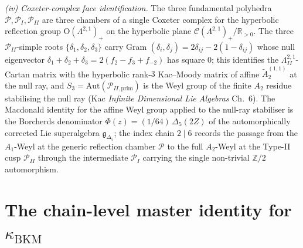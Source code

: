 \begin{lemma}
\emph{(iv) Coxeter-complex face identification.} The three
fundamental polyhedra $\mathcal{P},\mathcal{P}_I,\mathcal{P}_{II}$
are three chambers of a single Coxeter complex for the hyperbolic
reflection group $\mathrm{O}(\Lambda^{2,1})_+$ on the hyperbolic
plane $\mathcal{C}(\Lambda^{2,1})_+ / \mathbb{R}_{>0}$. The three
$\mathcal{P}_{II}$-simple roots $\{\delta_1, \delta_2, \delta_3\}$
carry Gram $(\delta_i, \delta_j) = 2\delta_{ij} - 2(1 - \delta_{ij})$
whose null eigenvector $\delta_1 + \delta_2 + \delta_3 =
2(f_2 - f_3 + f_{-2})$ has square $0$; this identifies the
$\Lambda^{2,1}_{II}$-Cartan matrix with the hyperbolic rank-$3$
Kac--Moody matrix of affine $\widetilde{A}_2^{(1,1)}$ at the null
ray, and $S_3 = \mathrm{Aut}(\mathcal{P}_{II,\mathrm{prim}})$ is
the Weyl group of the finite $A_2$ residue stabilising the null
ray (Kac \emph{Infinite Dimensional Lie Algebras} Ch.~6). The
Macdonald identity for the affine Weyl group applied to the
null-ray stabiliser is the Borcherds denominator
$\Phi(z) = (1/64)\,\Delta_5(2Z)$ of the automorphically corrected
Lie superalgebra $\mathfrak{g}_{\Delta_5}$; the index chain
$2 \mid 6$ records the passage from the $A_1$-Weyl at the generic
reflection chamber $\mathcal{P}$ to the full $A_2$-Weyl at the
Type-II cusp $\mathcal{P}_{II}$ through the intermediate
$\mathcal{P}_I$ carrying the single non-trivial $\mathbb{Z}/2$
automorphism.
\end{lemma}

\section{The chain-level master identity for \texorpdfstring{$\kappa_{\mathrm{BKM}}$}{kappa-BKM}}
\label{sec:chain-level-master-kappa-bkm}

\providecommand{\STr}{\mathrm{STr}}
\providecommand{\modop}{\mathrm{mod.op}}
\providecommand{\Mbar}{\overline{\mathcal{M}}}
\providecommand{\Abar}{\overline{\mathcal{A}}}
\providecommand{\GRTone}{\mathrm{GRT}_1}
\providecommand{\Ger}{\mathrm{Ger}}
\providecommand{\KS}{\mathrm{KS}}
\providecommand{\At}{\mathrm{At}}
\providecommand{\Ber}{\mathrm{Ber}}
\providecommand{\MO}{\mathrm{MO}}

